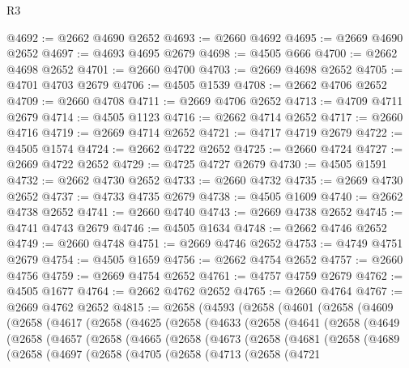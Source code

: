 \begin{lexlean}{R3}
\begin{coremodule}
@4692 := @2662 @4690 @2652
@4693 := @2660 @4692
@4695 := @2669 @4690 @2652
@4697 := @4693 @4695 @2679
@4698 := @4505 @666
@4700 := @2662 @4698 @2652
@4701 := @2660 @4700
@4703 := @2669 @4698 @2652
@4705 := @4701 @4703 @2679
@4706 := @4505 @1539
@4708 := @2662 @4706 @2652
@4709 := @2660 @4708
@4711 := @2669 @4706 @2652
@4713 := @4709 @4711 @2679
@4714 := @4505 @1123
@4716 := @2662 @4714 @2652
@4717 := @2660 @4716
@4719 := @2669 @4714 @2652
@4721 := @4717 @4719 @2679
@4722 := @4505 @1574
@4724 := @2662 @4722 @2652
@4725 := @2660 @4724
@4727 := @2669 @4722 @2652
@4729 := @4725 @4727 @2679
@4730 := @4505 @1591
@4732 := @2662 @4730 @2652
@4733 := @2660 @4732
@4735 := @2669 @4730 @2652
@4737 := @4733 @4735 @2679
@4738 := @4505 @1609
@4740 := @2662 @4738 @2652
@4741 := @2660 @4740
@4743 := @2669 @4738 @2652
@4745 := @4741 @4743 @2679
@4746 := @4505 @1634
@4748 := @2662 @4746 @2652
@4749 := @2660 @4748
@4751 := @2669 @4746 @2652
@4753 := @4749 @4751 @2679
@4754 := @4505 @1659
@4756 := @2662 @4754 @2652
@4757 := @2660 @4756
@4759 := @2669 @4754 @2652
@4761 := @4757 @4759 @2679
@4762 := @4505 @1677
@4764 := @2662 @4762 @2652
@4765 := @2660 @4764
@4767 := @2669 @4762 @2652
@4815 := @2658
    (@4593
      (@2658
        (@4601
          (@2658
            (@4609
              (@2658
                (@4617
                  (@2658
                    (@4625
                      (@2658
                        (@4633
                          (@2658
                            (@4641
                              (@2658
                                (@4649
                                  (@2658
                                    (@4657
                                      (@2658
                                        (@4665
                                          (@2658
                                            (@4673
                                              (@2658
                                                (@4681
                                                  (@2658
                                                    (@4689
                                                      (@2658
                                                        (@4697
                                                          (@2658
                                                            (@4705
                                                              (@2658
                                                                (@4713
                                                                  (@2658
                                                                    (@4721

\end{coremodule}
\end{lexlean}
